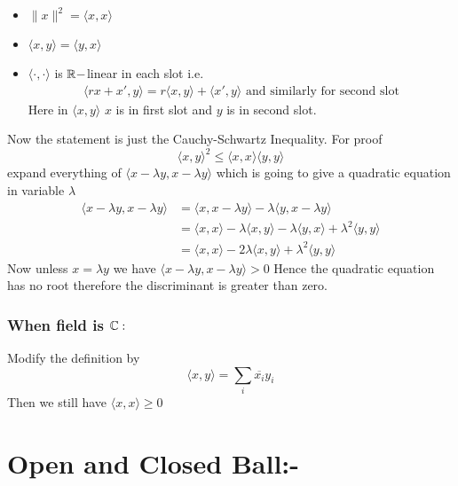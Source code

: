 {	\begin{note}
		\begin{itemize}
			\item $\|x\|^2=\langle x,x\rangle$
			\item $\langle x,y\rangle=\langle y,x\rangle$
			\item $\langle \cdot,\cdot\rangle$ is $\mathbb{R}-$linear in each slot i.e. \begin{align*}
				      \langle rx+x',y\rangle=r\langle x,y\rangle+\langle x',y\rangle	\text{ and similarly for second slot}
			      \end{align*}Here in $\langle x,y\rangle$ $x$ is in first slot and $y$ is in second slot.
		\end{itemize}
	\end{note}Now the statement is just the Cauchy-Schwartz Inequality. For proof $$\langle x,y\rangle^2\leq \langle x,x\rangle\langle y,y\rangle $$ expand everything of $\langle x-\lambda y,x-\lambda y\rangle$ which is going to give a quadratic equation in variable $\lambda $ \begin{align*}
		\langle x-\lambda y,x-\lambda y\rangle & =\langle x,x-\lambda y\rangle-\lambda\langle y,x-\lambda y\rangle                                       \\
		                                       & =\langle x ,x\rangle -\lambda\langle x,y\rangle -\lambda\langle y,x\rangle +\lambda^2\langle y,y\rangle \\
		                                       & =\langle x,x\rangle -2\lambda\langle x,y\rangle+\lambda^2\langle y,y\rangle
	\end{align*}Now unless $x=\lambda y$ we have $\langle x-\lambda y,x-\lambda y\rangle>0$ Hence the quadratic equation has no root therefore the discriminant is greater than zero.

	\subsubsection*{\textbf{When field is $\mathbb{C}:$}}Modify the definition by $$\langle x,y\rangle=\sum_i\overline{x_i}y_i$$Then we still have $\langle x,x\rangle\geq 0$}
\section{Open and Closed Ball:-}


